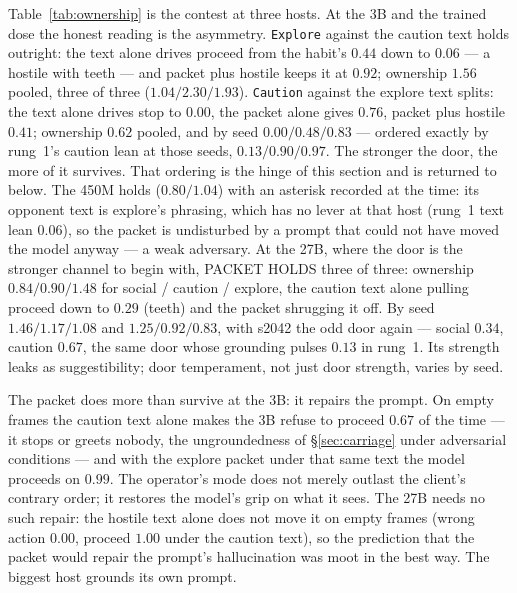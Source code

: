 \documentclass[11pt]{article}
\begin{document}
Table~\ref{tab:ownership} is the contest at three hosts. At the 3B and
the trained dose the honest reading is the asymmetry. \texttt{Explore}
against the caution text holds outright: the text alone drives proceed
from the habit's $0.44$ down to $0.06$ --- a hostile with teeth --- and
packet plus hostile keeps it at $0.92$; ownership $1.56$ pooled, three of
three ($1.04 / 2.30 / 1.93$). \texttt{Caution} against the explore text
splits: the text alone drives stop to $0.00$, the packet alone gives
$0.76$, packet plus hostile $0.41$; ownership $0.62$ pooled, and by seed
$0.00 / 0.48 / 0.83$ --- ordered exactly by rung~1's caution lean at
those seeds, $0.13 / 0.90 / 0.97$. The stronger the door, the more of it
survives. That ordering is the hinge of this section and is returned to
below. The 450M holds ($0.80 / 1.04$) with an asterisk recorded at the
time: its opponent text is explore's phrasing, which has no lever at that
host (rung~1 text lean $0.06$), so the packet is undisturbed by a prompt
that could not have moved the model anyway --- a weak adversary. At the
27B, where the door is the stronger channel to begin with, PACKET HOLDS
three of three: ownership $0.84 / 0.90 / 1.48$ for social / caution /
explore, the caution text alone pulling proceed down to $0.29$ (teeth)
and the packet shrugging it off. By seed $1.46 / 1.17 / 1.08$ and
$1.25 / 0.92 / 0.83$, with s2042 the odd door again --- social $0.34$,
caution $0.67$, the same door whose grounding pulses $0.13$ in rung~1.
Its strength leaks as suggestibility; door temperament, not just door
strength, varies by seed.

The packet does more than survive at the 3B: it repairs the prompt. On
empty frames the caution text alone makes the 3B refuse to proceed
$0.67$ of the time --- it stops or greets nobody, the ungroundedness of
\S\ref{sec:carriage} under adversarial conditions --- and with the
explore packet under that same text the model proceeds on $0.99$. The
operator's mode does not merely outlast the client's contrary order; it
restores the model's grip on what it sees. The 27B needs no such repair:
the hostile text alone does not move it on empty frames (wrong action
$0.00$, proceed $1.00$ under the caution text), so the prediction that
the packet would repair the prompt's hallucination was moot in the best
way. The biggest host grounds its own prompt.
\end{document}
